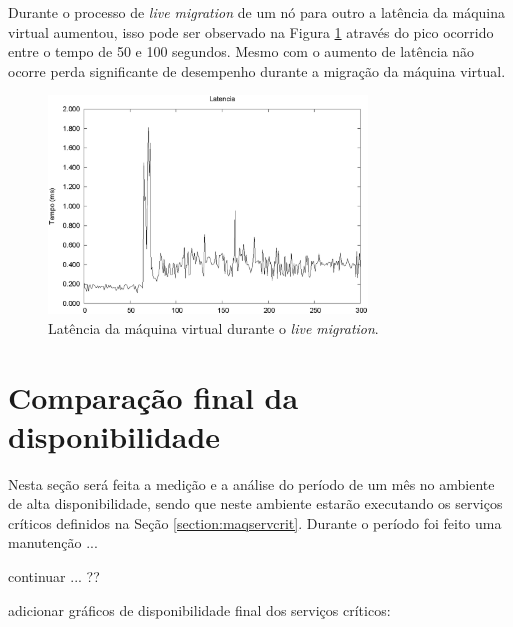 Durante o processo de \textit{live migration} de um nó para outro a latência da máquina virtual aumentou, isso pode ser observado na Figura 
\ref{fig:teste2_latencia} através do pico ocorrido entre o tempo de 50 e 100 segundos. Mesmo com o aumento de latência não ocorre 
perda significante de desempenho durante a migração da máquina virtual.
\begin{figure}[h!]
 \centering
 \includegraphics[width=320px]{img/teste2_latencia.eps}
 \caption{Latência da máquina virtual durante o \textit{live migration}.}
 \label{fig:teste2_latencia}
\end{figure}



\section{Comparação final da disponibilidade}
\label{section:comparacaofinal}

Nesta seção será feita a medição e a análise do período de um mês no ambiente de alta disponibilidade, sendo que neste ambiente estarão executando 
os serviços críticos definidos na Seção \ref{section:maqservcrit}.
Durante o período foi feito uma manutenção ...

continuar ... ??

adicionar gráficos de disponibilidade final dos serviços críticos:



